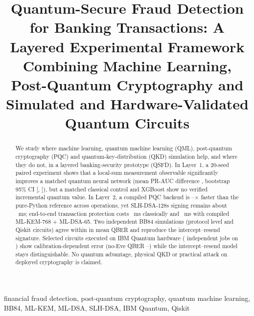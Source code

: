 \documentclass[conference]{IEEEtran}
\begin{document}
\title{Quantum-Secure Fraud Detection for Banking Transactions: A Layered Experimental Framework Combining Machine Learning, Post-Quantum Cryptography and Simulated and Hardware-Validated Quantum Circuits}

\author{
}
\maketitle

\begin{abstract}
We study where machine learning, quantum machine learning (QML), post-quantum cryptography (PQC) and quantum-key-distribution (QKD) simulation help, and where they do not, in a layered banking-security prototype (QSFD). In Layer~1, a 20-seed paired experiment shows that a local-sum measurement observable significantly improves a matched quantum neural network (mean PR-AUC difference \LsDelta{}, bootstrap 95\% CI [\LsCIlo{}, \LsCIhi{}]), but a matched classical control and XGBoost show no verified incremental quantum value. In Layer~2, a compiled PQC backend is \SpeedupMin{}--\SpeedupMax{}$\times$ faster than the pure-Python reference across operations, yet SLH-DSA-128s signing remains about \OptSlhSSignMs{}~ms; end-to-end transaction protection costs \EEAMedian{}~ms classically and \EECMedian{}~ms with compiled ML-KEM-768 + ML-DSA-65. Two independent BB84 simulations (protocol level and Qiskit circuits) agree within \BbMaxDiff{} in mean QBER and reproduce the intercept--resend signature. Selected circuits executed on IBM Quantum hardware (\HwJobs{} independent jobs on \HwBackend{}) show calibration-dependent error (no-Eve QBER \HwNoEveBest{}--\HwNoEveWorse{}) while the intercept--resend model stays distinguishable. No quantum advantage, physical QKD or practical attack on deployed cryptography is claimed.
\end{abstract}

\begin{IEEEkeywords}
financial fraud detection, post-quantum cryptography, quantum machine learning, BB84, ML-KEM, ML-DSA, SLH-DSA, IBM Quantum, Qiskit
\end{IEEEkeywords}
\end{document}
